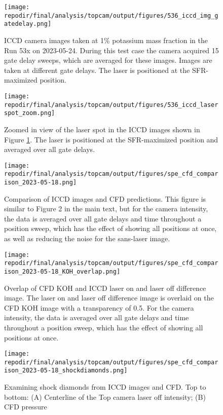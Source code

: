 \begin{figure}
    \centering
    \texttt{[image: \\repodir/final/analysis/topcam/output/figures/536\_iccd\_img\_gatedelay.png]} 
    \caption{ICCD camera images taken at 1\% potassium mass fraction in the Run 53x on 2023-05-24. During this test case the camera acquired 15 gate delay sweeps, which are averaged for these images. Images are taken at different gate delays. The laser is positioned at the SFR-maximized position. }
    \label{fig:SI_536_iccd}
\end{figure}


\begin{figure}
    \centering
    \texttt{[image: \\repodir/final/analysis/topcam/output/figures/536\_iccd\_laserspot\_zoom.png]} 
    \caption{Zoomed in view of the laser spot in the ICCD images shown in Figure \ref{fig:SI_536_iccd}. The laser is positioned at the SFR-maximized position and averaged over all gate delays.}
    \label{fig:SI_536_iccd_laserspot_zoom}
\end{figure}


\begin{figure}[]
\centering
\texttt{[image: \\repodir/final/analysis/topcam/output/figures/spe\_cfd\_comparison\_2023-05-18.png]}
\caption{Comparison of ICCD images and CFD predictions. This figure is similar to Figure 2 in the main text, but for the camera intensity, the data is averaged over all gate delays and time throughout a position sweep, which has the effect of showing all positions at once, as well as reducing the noise for the sans-laser image.}
\label{fig:SI_iccd_cfd_comparison}
\end{figure}


\begin{figure}[]
\centering
\texttt{[image: \\repodir/final/analysis/topcam/output/figures/spe\_cfd\_comparison\_2023-05-18\_KOH\_overlap.png]}
\caption{Overlap of CFD KOH and ICCD laser on and laser off difference image. The laser on and laser off difference image is overlaid on the CFD KOH image with a transparency of 0.5. For the camera intensity, the data is averaged over all gate delays and time throughout a position sweep, which has the effect of showing all positions at once.}
\label{fig:SI_iccd_cfd_comparison_KOH_overlap}
\end{figure}

\begin{figure}
    \centering
    \texttt{[image: \\repodir/final/analysis/topcam/output/figures/spe\_cfd\_comparison\_2023-05-18\_shockdiamonds.png]} 
    \caption{Examining shock diamonds from ICCD images and CFD. Top to bottom: (A) Centerline of the Top camera laser off intensity; (B) CFD pressure}
    \label{fig:SI_iccd_cfd_comparison_KOH}
\end{figure}

